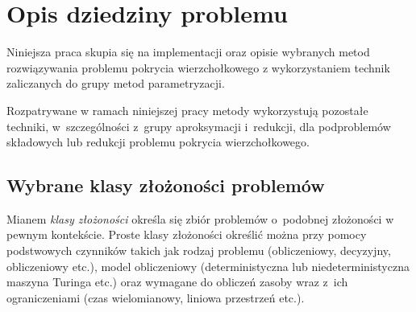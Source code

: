 \section{Opis dziedziny problemu}\label{Section_Domain}
\par{
  Niniejsza praca skupia się na implementacji oraz opisie wybranych metod 
  rozwiązywania problemu pokrycia wierzchołkowego z wykorzystaniem technik
  zaliczanych do grupy metod parametryzacji.

  Rozpatrywane w ramach niniejszej pracy metody wykorzystują pozostałe techniki,
  w~szczególności z~grupy aproksymacji i~redukcji, dla podproblemów składowych
  lub redukcji problemu pokrycia wierzchołkowego.
}
\subsection{Wybrane klasy złożoności problemów}\label{subsection_p_np}
\par{
  Mianem \emph{klasy złożoności} określa się zbiór problemów o~podobnej
  złożoności w pewnym kontekście. 
  Proste klasy złożoności określić można przy pomocy podstwowych czynników takich
  jak rodzaj problemu (obliczeniowy, decyzyjny, obliczeniowy etc.), model
  obliczeniowy (deterministyczna lub niedeterministyczna maszyna Turinga etc.)
  oraz wymagane do obliczeń zasoby wraz z~ich ograniczeniami (czas wielomianowy,
  liniowa przestrzeń etc.).
}

